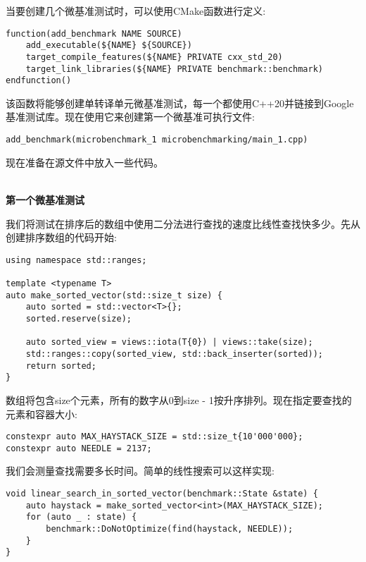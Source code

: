 当要创建几个微基准测试时，可以使用CMake函数进行定义:

\begin{lstlisting}[style=styleCMake]
function(add_benchmark NAME SOURCE)
	add_executable(${NAME} ${SOURCE})
	target_compile_features(${NAME} PRIVATE cxx_std_20)
	target_link_libraries(${NAME} PRIVATE benchmark::benchmark)
endfunction()
\end{lstlisting}

该函数将能够创建单转译单元微基准测试，每一个都使用C++20并链接到Google基准测试库。现在使用它来创建第一个微基准可执行文件:

\begin{lstlisting}[style=styleCMake]
add_benchmark(microbenchmark_1 microbenchmarking/main_1.cpp)
\end{lstlisting}

现在准备在源文件中放入一些代码。

\hspace*{\fill} \\ %
\noindent
\textbf{第一个微基准测试}

我们将测试在排序后的数组中使用二分法进行查找的速度比线性查找快多少。先从创建排序数组的代码开始:

\begin{lstlisting}[style=styleCXX]
using namespace std::ranges;

template <typename T>
auto make_sorted_vector(std::size_t size) {
	auto sorted = std::vector<T>{};
	sorted.reserve(size);
	
	auto sorted_view = views::iota(T{0}) | views::take(size);
	std::ranges::copy(sorted_view, std::back_inserter(sorted));
	return sorted;
}
\end{lstlisting}

数组将包含size个元素，所有的数字从0到size - 1按升序排列。现在指定要查找的元素和容器大小:

\begin{lstlisting}[style=styleCXX]
constexpr auto MAX_HAYSTACK_SIZE = std::size_t{10'000'000};
constexpr auto NEEDLE = 2137;
\end{lstlisting}

我们会测量查找需要多长时间。简单的线性搜索可以这样实现:

\begin{lstlisting}[style=styleCXX]
void linear_search_in_sorted_vector(benchmark::State &state) {
	auto haystack = make_sorted_vector<int>(MAX_HAYSTACK_SIZE);
	for (auto _ : state) {
		benchmark::DoNotOptimize(find(haystack, NEEDLE));
	}
}
\end{lstlisting}

